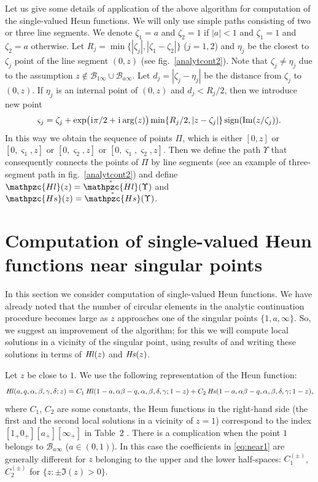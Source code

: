 \documentclass[11pt]{article}
\newcommand{\MF}[1]{\mathop{#1}\nolimits}
\newcommand{\ii}{\kern0.05em\mathrm{i}\kern0.05em} \newcommand{\E}[1]{\textrm{e}^{#1}}
\newcommand{\sign}{\mathop{\textrm{sign}}}
\newcommand{\BCone}{\mathscr{B}_{1\infty}}%
\newcommand{\BCa}{\mathscr{B}_{a\infty}}
\def\HeunL{\MF{\textit{Hl\/}}}%
\def\HeunS{\MF{\textit{Hs\/}}}%
\def\psHeunLfin{\mathpzc{Hl}}%
\def\psHeunSfin{\mathpzc{Hs}}%
\begin{document}
Let us give some details of application of the above algorithm for computation
of the single-valued Heun functions. We will only use simple paths consisting of
two or three line segments. We denote $\zeta_1=a$ and $\zeta_2=1$ if $|a|<1$ and
$\zeta_1=1$ and $\zeta_2=a$ otherwise. Let $R_j =
\min\{|\zeta_j|,|\zeta_1-\zeta_2|\}$ ($j=1,2$) and $\eta_j$ be the closest to
$\zeta_j$ point of the line segment $(0,z)$ (see fig.~\ref{analytcont2}). Note
that $\zeta_j\neq\eta_j$ due to the assumption $z\not\in\BCone\cup\BCa$. Let
$d_j=|\zeta_j-\eta_j|$ be the distance from $\zeta_j$ to $(0,z)$. If $\eta_j$ is
an internal point of $(0,z)$ and $d_j<R_j/2$, then we introduce new point
\[
\varsigma_j=\zeta_j+\exp\bigl(\ii\pi/2+\ii\arg(z)\bigr)\min\{R_j/2,|z-\zeta_j|\}
\sign(\Im(z/\zeta_j)).
\]
In this way we obtain the sequence of points $\Pi$, which is either $[0,z]$ or
$[0,\varsigma_1,z]$ or $[0,\varsigma_2,z]$ or $[0,\varsigma_1,\varsigma_2,z]$.
Then we define the path $\Upsilon$ that consequently connects the points of
$\Pi$ by line segments (see an example of three-segment path in
fig.~\ref{analytcont2}) and define
$\psHeunLfin(z)=\mathring{\psHeunLfin}(\Upsilon)$ and
$\psHeunSfin(z)=\mathring{\psHeunSfin}(\Upsilon)$.


\section{Computation of single-valued Heun functions near singular points}
\label{sect:improvement}

In this section we consider computation of single-valued Heun functions. We have
already noted that the number of circular elements in the analytic continuation
procedure becomes large as $z$ approaches one of the singular points
$\{1,a,\infty\}$. So, we suggest an improvement of the algorithm; for this we
will compute local solutions in a vicinity of the singular point, using results
of \cite{192-Maier2007} and writing these solutions in terms of $\HeunL(z)$ and
$\HeunS(z)$.

Let $z$ be close to $1$. We use the following representation of the Heun
function:
\begin{multline}
\HeunL(a,q,\alpha,\beta,\gamma,\delta;z) = C_1
\HeunL(1-a,\alpha\beta-q,\alpha,\beta,\delta,\gamma;1-z)+ C_2
\HeunS(1-a,\alpha\beta-q,\alpha,\beta,\delta,\gamma;1-z),
\label{eq:near1}
\end{multline}
where $C_1$, $C_2$ are some constants, the Heun functions in the right-hand side
(the first and the second local solutions in a vicinity of $z=1$) correspond to
the index $[1_+0_+][a_+][\infty_+]$ in Table~2 \cite{192-Maier2007}. There is a
complication when the point $1$ belongs to $\BCa$ ($a\in(0,1)$). In this case
the coefficients in \eqref{eq:near1} are generally different for $z$ belonging
to the upper and the lower half-spaces: $C^{(\pm)}_1$, $C^{(\pm)}_2$ for
$\{z:\pm\Im(z)>0\}$.
\end{document}

